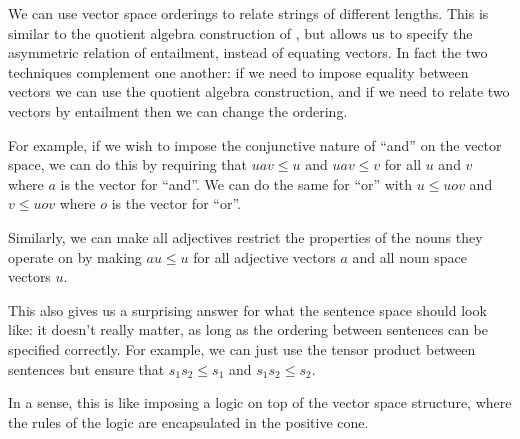 \documentclass{article}
\begin{document}
We can use vector space orderings to relate strings of different
lengths. This is similar to the quotient algebra construction of
\cite{Clarke:10}, but allows us to specify the asymmetric relation of
entailment, instead of equating vectors. In fact the two techniques
complement one another: if we need to impose equality between vectors
we can use the quotient algebra construction, and if we need to relate
two vectors by entailment then we can change the ordering.

For example, if we wish to impose the conjunctive nature of ``and'' on
the vector space, we can do this by requiring that $uav \le u$ and
$uav \le v$ for all $u$ and $v$ where $a$ is the vector for
``and''. We can do the same for ``or'' with $u \le uov$ and $v\le uov$
where $o$ is the vector for ``or''.

Similarly, we can make all adjectives restrict the properties of the
nouns they operate on by making $au \le u$ for all adjective vectors
$a$ and all noun space vectors $u$.

This also gives us a surprising answer for what the sentence space
should look like: it doesn't really matter, as long as the ordering
between sentences can be specified correctly. For example, we can just
use the tensor product between sentences but ensure that $s_1s_2 \le
s_1$ and $s_1s_2\le s_2$.

In a sense, this is like imposing a logic on top of the vector space
structure, where the rules of the logic are encapsulated in the
positive cone.





\end{document}
